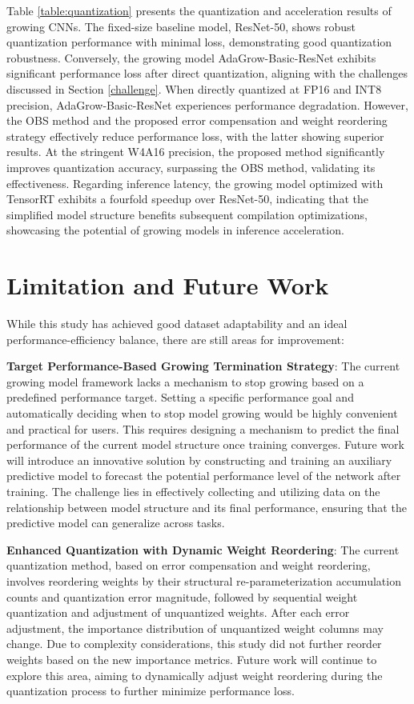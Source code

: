 \documentclass[preprint,12pt]{elsarticle}
\begin{document}
Table \ref{table:quantization} presents the quantization and acceleration results of growing CNNs. The fixed-size baseline model, ResNet-50, shows robust quantization performance with minimal loss, demonstrating good quantization robustness. Conversely, the growing model AdaGrow-Basic-ResNet exhibits significant performance loss after direct quantization, aligning with the challenges discussed in Section \ref{challenge}. When directly quantized at FP16 and INT8 precision, AdaGrow-Basic-ResNet experiences performance degradation. However, the OBS method and the proposed error compensation and weight reordering strategy effectively reduce performance loss, with the latter showing superior results. At the stringent W4A16 precision, the proposed method significantly improves quantization accuracy, surpassing the OBS method, validating its effectiveness. Regarding inference latency, the growing model optimized with TensorRT exhibits a fourfold speedup over ResNet-50, indicating that the simplified model structure benefits subsequent compilation optimizations, showcasing the potential of growing models in inference acceleration.

\section{Limitation and Future Work}

While this study has achieved good dataset adaptability and an ideal performance-efficiency balance, there are still areas for improvement:

\textbf{Target Performance-Based Growing Termination Strategy}: The current growing model framework lacks a mechanism to stop growing based on a predefined performance target. Setting a specific performance goal and automatically deciding when to stop model growing would be highly convenient and practical for users. This requires designing a mechanism to predict the final performance of the current model structure once training converges. Future work will introduce an innovative solution by constructing and training an auxiliary predictive model to forecast the potential performance level of the network after training. The challenge lies in effectively collecting and utilizing data on the relationship between model structure and its final performance, ensuring that the predictive model can generalize across tasks.

\textbf{Enhanced Quantization with Dynamic Weight Reordering}: The current quantization method, based on error compensation and weight reordering, involves reordering weights by their structural re-parameterization accumulation counts and quantization error magnitude, followed by sequential weight quantization and adjustment of unquantized weights. After each error adjustment, the importance distribution of unquantized weight columns may change. Due to complexity considerations, this study did not further reorder weights based on the new importance metrics. Future work will continue to explore this area, aiming to dynamically adjust weight reordering during the quantization process to further minimize performance loss.
\end{document}
